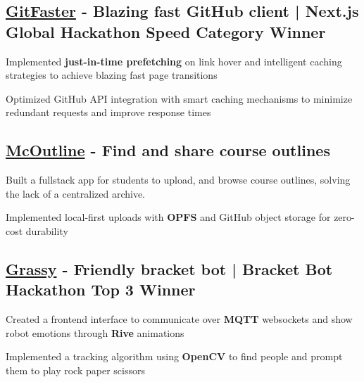 \subsection{\href{https://gitfaster.dev/}{GitFaster} - Blazing fast GitHub client | \textbf{Next.js Global Hackathon Speed Category Winner}}
\begin{zitemize}
    \item Implemented \textbf{just-in-time prefetching} on link hover and intelligent caching strategies to achieve blazing fast page transitions
    \item Optimized GitHub API integration with smart caching mechanisms to minimize redundant requests and improve response times
\end{zitemize}

\subsection{\href{https://www.mcoutline.ca/}{McOutline} - Find and share course outlines}
\begin{zitemize}
    \item Built a fullstack app for students to upload, and browse course outlines, solving the lack of a centralized archive.
    \item Implemented local-first uploads with \textbf{OPFS} and GitHub object storage for zero-cost durability
\end{zitemize}



\subsection{\href{https://github.com/arian81/bracket-bot-controller}{Grassy} - Friendly bracket bot | \textbf{Bracket Bot Hackathon Top 3 Winner}}
\begin{zitemize}
    \item Created a frontend interface to communicate over \textbf{MQTT} websockets and show robot emotions through \textbf{Rive} animations
    \item Implemented a tracking algorithm using \textbf{OpenCV} to find people and prompt them to play rock paper scissors
\end{zitemize}

